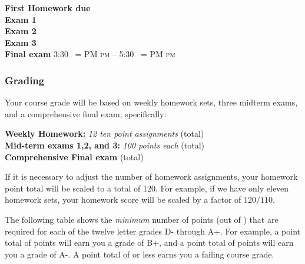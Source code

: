 \documentclass[12pt]{article}
\makeatletter
\newcounter{ex}\setcounter{ex}{0}
\newenvironment{mypar}[2]
  {\begin{list}{}%
    {\setlength\leftmargin{#1}
    \setlength\rightmargin{#2}}
    \item[]}
  {\end{list}}
\DeclareRobustCommand{\maybefakesc}[1]{%
  \ifnum\pdfstrcmp{\f@series}{\bfdefault}=\z@
    {\fontsize{\dimexpr0.8\dimexpr\f@size pt\relax}{0}\selectfont\uppercase{#1}}%
  \else
    \textsc{#1}%
  \fi
}
\newcommand\PM{\,\maybefakesc{pm}\xspace}
\makeatother
\begin{document}
\begin{mypar}{0.25in}{0.25in} 

      \textbf{First Homework due} \dotfill  {}  \\
       \textbf{Exam 1} \dotfill {}  \\
    \textbf{Exam 2} \dotfill  {} \\
    \textbf{Exam 3} \dotfill {} \\
      \textbf{Final exam} \dotfill  {} 3:30 \PM  --  5:30 \PM
\end{mypar}



\subsubsection*{Grading}

Your course grade will be based on weekly homework sets, three midterm exams, and a comprehensive 
final exam; specifically:
\begin{mypar}{0.25in}{0.25in}
    \textbf{Weekly Homework:}  \emph{12 ten point assignments}   (total) \\
    \textbf{Mid-term exams 1,2, and 3:} \emph{100 points each}  (total)\\
      \textbf{Comprehensive Final exam}  (total)
\end{mypar}
If it is necessary to adjust the number of  homework assignments,  your homework point 
total will be scaled to a total of 120.  For example, if we have only eleven homework sets, your homework score will
be scaled by a factor of \(120/110\).





The following table shows the \emph{minimum} number of points (out of \points) that
are required for each of the twelve letter grades D- through A+. For
example, a point total of \Bp\/  points will earn you a grade of B+,  and 
a point total of \Am\/ points will earn you a grade of A-. A point
total of \F\/  or less earns you a failing course grade.
 
\end{document}
